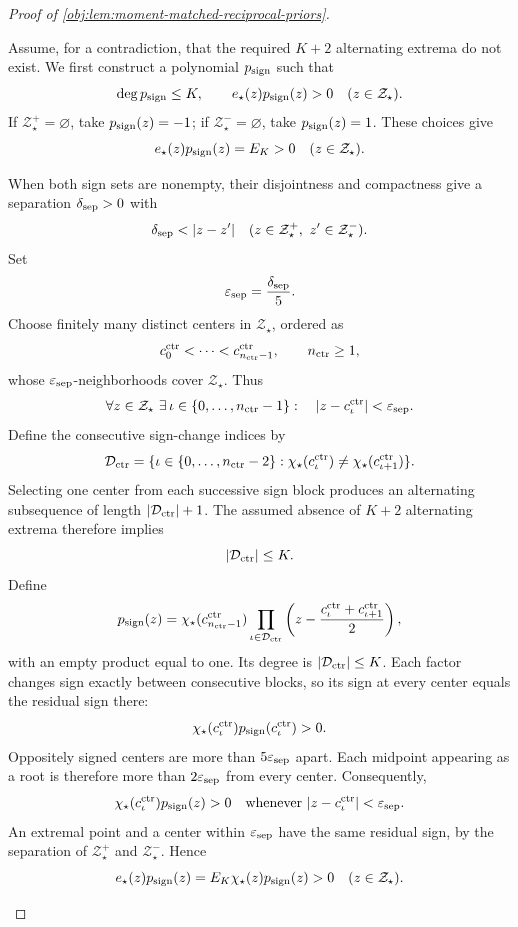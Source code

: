 \begin{proof}[Proof of \cref{obj:lem:moment-matched-reciprocal-priors}]
\begin{enumerate}
Assume, for a contradiction, that the required \(K+2\) alternating extrema do not exist. We first construct a polynomial \(p_{\rm sign}\) such that
\[
\deg p_{\rm sign}\le K,\qquad
e_\star(z)p_{\rm sign}(z)>0
\quad(z\in\mathcal Z_\star).
\]
If \(\mathcal Z_\star^+=\varnothing\), take \(p_{\rm sign}(z)=-1\); if \(\mathcal Z_\star^-=\varnothing\), take \(p_{\rm sign}(z)=1\). These choices give
\[
e_\star(z)p_{\rm sign}(z)=E_K>0
\quad(z\in\mathcal Z_\star).
\]

When both sign sets are nonempty, their disjointness and compactness give a separation \(\delta_{\rm sep}>0\) with
\[
\delta_{\rm sep}<|z-z'|
\quad(z\in\mathcal Z_\star^+,\ z'\in\mathcal Z_\star^-).
\]
Set
\[
\varepsilon_{\rm sep}=\frac{\delta_{\rm sep}}5.
\]
Choose finitely many distinct centers in \(\mathcal Z_\star\), ordered as
\[
c_0^{\rm ctr}<\cdots<c_{n_{\rm ctr}-1}^{\rm ctr},
\qquad n_{\rm ctr}\ge1,
\]
whose \(\varepsilon_{\rm sep}\)-neighborhoods cover \(\mathcal Z_\star\). Thus
\[
\forall z\in\mathcal Z_\star\ \exists\,\iota\in\{0,\ldots,n_{\rm ctr}-1\}:
\quad |z-c_\iota^{\rm ctr}|<\varepsilon_{\rm sep}.
\]
Define the consecutive sign-change indices by
\[
\mathcal D_{\rm ctr}
=\{\iota\in\{0,\ldots,n_{\rm ctr}-2\}:
  \chi_\star(c_\iota^{\rm ctr})
  \ne\chi_\star(c_{\iota+1}^{\rm ctr})\}.
\]
Selecting one center from each successive sign block produces an alternating subsequence of length \(|\mathcal D_{\rm ctr}|+1\). The assumed absence of \(K+2\) alternating extrema therefore implies
\[
|\mathcal D_{\rm ctr}|\le K.
\]
Define
\[
p_{\rm sign}(z)
=\chi_\star(c_{n_{\rm ctr}-1}^{\rm ctr})
 \prod_{\iota\in\mathcal D_{\rm ctr}}
 \left(z-\frac{c_\iota^{\rm ctr}+c_{\iota+1}^{\rm ctr}}2\right),
\]
with an empty product equal to one. Its degree is \(|\mathcal D_{\rm ctr}|\le K\). Each factor changes sign exactly between consecutive blocks, so its sign at every center equals the residual sign there:
\[
\chi_\star(c_\iota^{\rm ctr})p_{\rm sign}(c_\iota^{\rm ctr})>0.
\]
Oppositely signed centers are more than \(5\varepsilon_{\rm sep}\) apart. Each midpoint appearing as a root is therefore more than \(2\varepsilon_{\rm sep}\) from every center. Consequently,
\[
\chi_\star(c_\iota^{\rm ctr})p_{\rm sign}(z)>0
\quad\text{whenever }|z-c_\iota^{\rm ctr}|<\varepsilon_{\rm sep}.
\]
An extremal point and a center within \(\varepsilon_{\rm sep}\) have the same residual sign, by the separation of \(\mathcal Z_\star^+\) and \(\mathcal Z_\star^-\). Hence
\[
e_\star(z)p_{\rm sign}(z)
=E_K\chi_\star(z)p_{\rm sign}(z)>0
\quad(z\in\mathcal Z_\star).
\]


\end{enumerate}
\end{proof}
